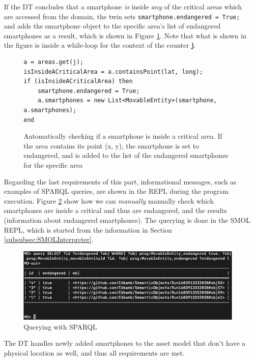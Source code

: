 \documentclass{article}
\begin{document}
If the DT concludes that a smartphone \emph{is} inside \emph{any} of the critical areas which are accessed from the domain, the twin sets \verb|smartphone.endangered = True;| and adds the smartphone object to the specific area's list of endangered smartphones as a result, which is shown in Figure \ref{fig:add_endangered}. Note that what is shown in the figure is inside a while-loop for the context of the counter \textbf{j}.

\begin{figure}[H]
    \centering
    \begin{verbatim}
a = areas.get(j);
isInsideACriticalArea = a.containsPoint(lat, long);
if (isInsideACriticalArea) then
    smartphone.endangered = True;
    a.smartphones = new List<MovableEntity>(smartphone, a.smartphones);
end
    \end{verbatim}
    \caption{Automatically checking if a smartphone is inside a critical area. If the area contains its point (x, y), the smartphone is set to endangered, and is added to the list of the endangered smartphones for the specific area}
    \label{fig:add_endangered}
\end{figure}

Regarding the last requirements of this part, informational messages, such as examples of SPARQL queries, are shown in the REPL during the program execution. Figure \ref{fig:sparql_smol} show how we can \emph{manually} manually check which smartphones are inside a critical and thus are endangered, and the results (information about endangered smartphones). The querying is done in the SMOL REPL, which is started from the information in Section \ref{subsubsec:SMOLInterpreter}.

\begin{figure}[H]
    \centering
    \includegraphics[scale=0.44]{graphics/sparql_smol}
    \caption{Querying with SPARQL}
    \label{fig:sparql_smol}
\end{figure}

The DT handles newly added smartphones to the asset model that don't have a physical location as well, and thus all requirements are met.
\end{document}
